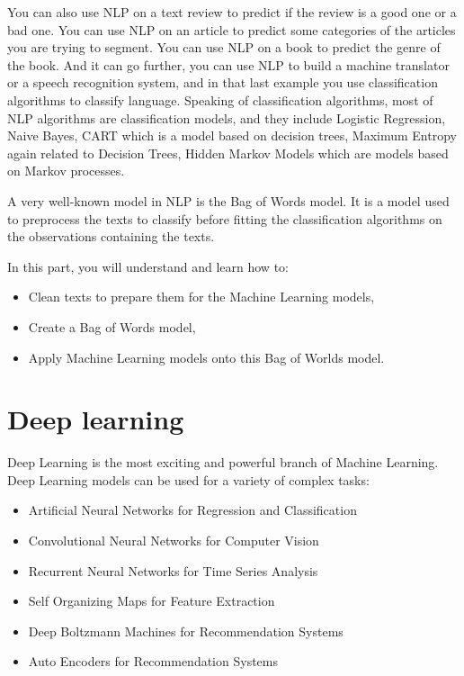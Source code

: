 \documentclass[runningheads,a4paper]{llncs}
\begin{document}
You can also use NLP on a text review to predict if the review is a good one or a bad one. You can use NLP on an article to predict some categories of the articles you are trying to segment. You can use NLP on a book to predict the genre of the book. And it can go further, you can use NLP to build a machine translator or a speech recognition system, and in that last example you use classification algorithms to classify language. Speaking of classification algorithms, most of NLP algorithms are classification models, and they include Logistic Regression, Naive Bayes, CART which is a model based on decision trees, Maximum Entropy again related to Decision Trees, Hidden Markov Models which are models based on Markov processes.

A very well-known model in NLP is the Bag of Words model. It is a model used to preprocess the texts to classify before fitting the classification algorithms on the observations containing the texts.

In this part, you will understand and learn how to:

\begin{itemize}
\item Clean texts to prepare them for the Machine Learning models,
\item Create a Bag of Words model,
\item Apply Machine Learning models onto this Bag of Worlds model.
\end{itemize}


\newpage
\section{Deep learning}

Deep Learning is the most exciting and powerful branch of Machine Learning. Deep Learning models can be used for a variety of complex tasks:

\begin{itemize}
\item Artificial Neural Networks for Regression and Classification
\item Convolutional Neural Networks for Computer Vision
\item Recurrent Neural Networks for Time Series Analysis
\item Self Organizing Maps for Feature Extraction
\item Deep Boltzmann Machines for Recommendation Systems
\item Auto Encoders for Recommendation Systems
\end{itemize}
\end{document}
